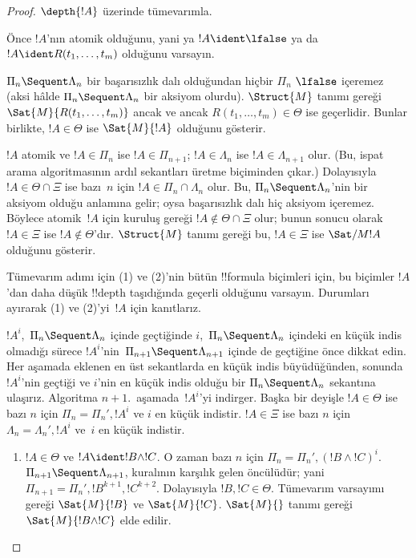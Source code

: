 \documentclass[../../../include/open-logic-section]{subfiles}
\begin{document}
\begin{proof}
  $\depth{!A}$ üzerinde tümevarımla.

Önce $!A$'nın atomik olduğunu, yani ya $!A \ident \lfalse$ ya da $!A
\ident R(t_1, \dots, t_m)$ olduğunu varsayın.

$\Pi_n \Sequent \Lambda_n$ bir başarısızlık dalı olduğundan hiçbir $\Pi_n$
$\lfalse$ içeremez (aksi hâlde $\Pi_n \Sequent \Lambda_n$ bir aksiyom
olurdu). $\Struct{M}$ tanımı gereği $\Sat{M}{R(t_1, \dots, t_m)}$ ancak ve
ancak $R(t_1, \dots, t_m) \in \Theta$ ise geçerlidir. Bunlar birlikte,
$!A \in \Theta$ ise $\Sat{M}{!A}$ olduğunu gösterir.

$!A$ atomik ve $!A \in \Pi_n$ ise $!A \in \Pi_{n+1}$; $!A \in
\Lambda_n$ ise $!A \in \Lambda_{n+1}$ olur. (Bu, ispat arama
algoritmasının ardıl sekantları üretme biçiminden çıkar.) Dolayısıyla $!A
\in \Theta \cap \Xi$ ise bazı~$n$ için $!A \in \Pi_n \cap \Lambda_n$
olur. Bu, $\Pi_n \Sequent \Lambda_n$'nin bir aksiyom olduğu anlamına gelir;
oysa başarısızlık dalı hiç aksiyom içeremez. Böylece atomik~$!A$ için kuruluş
gereği $!A \notin \Theta \cap \Xi$ olur; bunun sonucu olarak $!A \in \Xi$
ise $!A \notin \Theta$'dır. $\Struct{M}$ tanımı gereği bu, $!A \in \Xi$
ise $\Sat/{M}{!A}$ olduğunu gösterir.

Tümevarım adımı için (1) ve (2)'nin bütün !!{formula} biçimleri için,
bu biçimler $!A$'dan daha düşük !!{depth} taşıdığında geçerli olduğunu
varsayın. Durumları ayırarak (1) ve
(2)'yi~$!A$ için kanıtlarız.

$!A^i$,~$\Pi_n \Sequent \Lambda_n$ içinde geçtiğinde $i$,~$\Pi_n \Sequent
\Lambda_n$ içindeki en küçük indis olmadığı sürece $!A^i$'nin~$\Pi_{n+1}
\Sequent \Lambda_{n+1}$ içinde de geçtiğine önce dikkat edin. Her aşamada
eklenen en üst sekantlarda en küçük indis büyüdüğünden, sonunda $!A^i$'nin
geçtiği ve $i$'nin en küçük indis olduğu bir $\Pi_n \Sequent \Lambda_n$
sekantına ulaşırız. Algoritma $n+1$.~aşamada~$!A^i$'yi indirger. Başka bir
deyişle $!A \in \Theta$ ise bazı $n$ için $\Pi_n = \Pi_n', !A^i$ ve $i$ en
küçük indistir. $!A \in \Xi$ ise bazı $n$ için $\Lambda_n = \Lambda_n',
!A^i$ ve~$i$ en küçük indistir.

\begin{enumerate}
  \item $!A \in \Theta$ ve $!A \ident !B \land !C$. O zaman bazı $n$ için
  $\Pi_n = \Pi_n', (!B \land !C)^i$. $\Pi_{n+1} \Sequent \Lambda_{n+1}$,
  \LeftR{\land} kuralının karşılık gelen öncülüdür; yani $\Pi_{n+1} =
  \Pi_n', !B^{k+1}, !C^{k+2}$. Dolayısıyla $!B, !C \in \Theta$.
  Tümevarım varsayımı gereği $\Sat{M}{!B}$ ve $\Sat{M}{!C}$. $\Sat{M}{}$
  tanımı gereği $\Sat{M}{!B \land !C}$ elde edilir.


\end{enumerate}
\end{proof}
\end{document}
